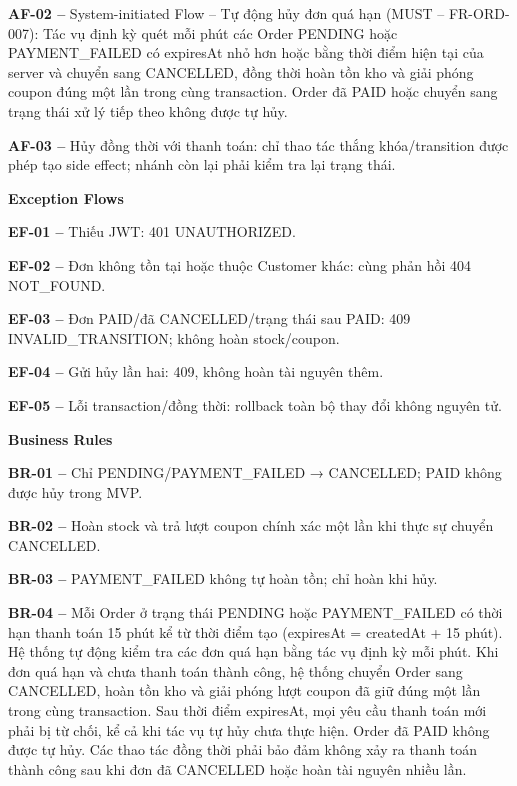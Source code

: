 \documentclass[11pt,a4paper,oneside]{report}
\begin{document}
\textbf{AF-02 --} System-initiated Flow -- Tự động hủy đơn quá hạn (MUST -- FR-ORD-007): Tác vụ định kỳ quét mỗi phút các Order PENDING hoặc PAYMENT\_FAILED có expiresAt nhỏ hơn hoặc bằng thời điểm hiện tại của server và chuyển sang CANCELLED, đồng thời hoàn tồn kho và giải phóng coupon đúng một lần trong cùng transaction. Order đã PAID hoặc chuyển sang trạng thái xử lý tiếp theo không được tự hủy.

\textbf{AF-03 --} Hủy đồng thời với thanh toán: chỉ thao tác thắng khóa/transition được phép tạo side effect; nhánh còn lại phải kiểm tra lại trạng thái.
\par

\par\smallskip\noindent\textcolor{sgublue}{\textbf{Exception Flows}}\par\nobreak
\textbf{EF-01 --} Thiếu JWT: 401 UNAUTHORIZED.

\textbf{EF-02 --} Đơn không tồn tại hoặc thuộc Customer khác: cùng phản hồi 404 NOT\_FOUND.

\textbf{EF-03 --} Đơn PAID/đã CANCELLED/trạng thái sau PAID: 409 INVALID\_TRANSITION; không hoàn stock/coupon.

\textbf{EF-04 --} Gửi hủy lần hai: 409, không hoàn tài nguyên thêm.

\textbf{EF-05 --} Lỗi transaction/đồng thời: rollback toàn bộ thay đổi không nguyên tử.
\par

\par\smallskip\noindent\textcolor{sgublue}{\textbf{Business Rules}}\par\nobreak
\textbf{BR-01 --} Chỉ PENDING/PAYMENT\_FAILED → CANCELLED; PAID không được hủy trong MVP.

\textbf{BR-02 --} Hoàn stock và trả lượt coupon chính xác một lần khi thực sự chuyển CANCELLED.

\textbf{BR-03 --} PAYMENT\_FAILED không tự hoàn tồn; chỉ hoàn khi hủy.

\textbf{BR-04 --} Mỗi Order ở trạng thái PENDING hoặc PAYMENT\_FAILED có thời hạn thanh toán 15 phút kể từ thời điểm tạo (expiresAt = createdAt + 15 phút). Hệ thống tự động kiểm tra các đơn quá hạn bằng tác vụ định kỳ mỗi phút. Khi đơn quá hạn và chưa thanh toán thành công, hệ thống chuyển Order sang CANCELLED, hoàn tồn kho và giải phóng lượt coupon đã giữ đúng một lần trong cùng transaction. Sau thời điểm expiresAt, mọi yêu cầu thanh toán mới phải bị từ chối, kể cả khi tác vụ tự hủy chưa thực hiện. Order đã PAID không được tự hủy. Các thao tác đồng thời phải bảo đảm không xảy ra thanh toán thành công sau khi đơn đã CANCELLED hoặc hoàn tài nguyên nhiều lần.
\end{document}
